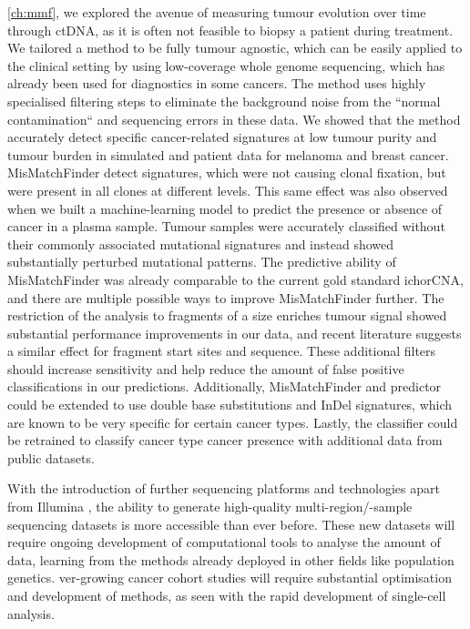  \autoref{ch:mmf}, we explored the avenue of measuring tumour evolution over time through ctDNA, as it is often not feasible to biopsy a patient during treatment. We tailored a method to be fully tumour agnostic, which can be easily applied to the clinical setting by using low-coverage whole genome sequencing, which has already been used for diagnostics in some cancers. The method uses highly specialised filtering steps to eliminate the background noise from the ``normal contamination`` and sequencing errors in these data. We showed that the method  accurately detect specific cancer-related signatures at low tumour purity and tumour burden in simulated and patient data for melanoma and breast cancer. MisMatchFinder detect signatures, which were not causing clonal fixation, but were present in all clones at different levels. This same effect was also observed when we built a machine-learning model to predict the presence or absence of cancer in a plasma sample. Tumour samples were accurately classified without their commonly associated mutational signatures and instead showed substantially perturbed mutational patterns. The predictive ability of MisMatchFinder was already comparable to the current gold standard ichorCNA, and there are multiple possible ways to improve MisMatchFinder further. The restriction of the analysis to fragments of a size  enriches  tumour signal showed substantial performance improvements in our data, and recent literature suggests a similar effect for fragment start sites and sequence. These additional filters should increase sensitivity and help reduce the amount of false positive classifications in our predictions. Additionally, MisMatchFinder and predictor could be extended to use double base substitutions and InDel signatures, which are known to be very specific for certain cancer types. Lastly, the classifier could be retrained to classify cancer type  cancer presence with additional data from public datasets.

With the introduction of further sequencing platforms and technologies apart from Illumina \cite{SingularGenomics2021,UltimaGenomics2022,ElementBiosciences2022}, the ability to generate high-quality multi-region/-sample sequencing datasets is more accessible than ever before. These new datasets will require ongoing development of computational tools to analyse the amount of data, learning from the methods already deployed in other fields like population genetics. ver-growing cancer cohort studies will require substantial optimisation and development of methods, as seen with the rapid development of single-cell analysis. 

